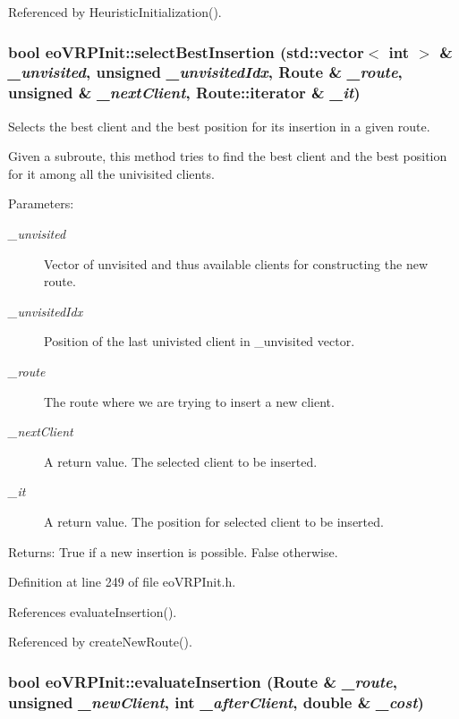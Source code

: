 Referenced by Heuristic\-Initialization().
\subsubsection{\setlength{\rightskip}{0pt plus 5cm}bool eo\-VRPInit::select\-Best\-Insertion (std::vector$<$ int $>$ \& {\em \_\-unvisited}, unsigned {\em \_\-unvisited\-Idx}, Route \& {\em \_\-route}, unsigned \& {\em \_\-next\-Client}, Route::iterator \& {\em \_\-it})\hspace{0.3cm}{\tt  [inline, private]}}\label{classeo_v_r_p_init_7f07be1f3a027dc56af84bb46828ddda}


Selects the best client and the best position for its insertion in a given route. 

Given a subroute, this method tries to find the best client and the best position for it among all the univisited clients. \begin{Desc}
\item[Parameters:]
\begin{description}
\item[{\em \_\-unvisited}]Vector of unvisited and thus available clients for constructing the new route. \item[{\em \_\-unvisited\-Idx}]Position of the last univisted client in \_\-unvisited vector. \item[{\em \_\-route}]The route where we are trying to insert a new client. \item[{\em \_\-next\-Client}]A return value. The selected client to be inserted. \item[{\em \_\-it}]A return value. The position for selected client to be inserted. \end{description}
\end{Desc}
\begin{Desc}
\item[Returns:]True if a new insertion is possible. False otherwise. \end{Desc}


Definition at line 249 of file eo\-VRPInit.h.

References evaluate\-Insertion().

Referenced by create\-New\-Route().
\subsubsection{\setlength{\rightskip}{0pt plus 5cm}bool eo\-VRPInit::evaluate\-Insertion (Route \& {\em \_\-route}, unsigned {\em \_\-new\-Client}, int {\em \_\-after\-Client}, double \& {\em \_\-cost})\hspace{0.3cm}{\tt  [inline, private]}}\label{classeo_v_r_p_init_82f2bb762d8f5da85febd266fb75a29b}


